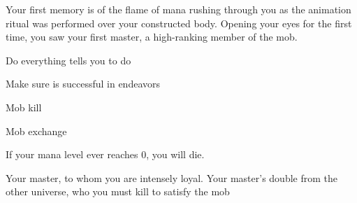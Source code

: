 \documentclass[char]{guildcamp3}
\begin{document}
\name{\cServant{}}



Your first memory is of the flame of mana rushing through you as the animation ritual was performed over your constructed body. Opening your eyes for the first time, you saw your first master, a high-ranking member of the mob.

\begin{itemz}[Goals]
  \item Do everything \cNobleOne{} tells you to do
  \item Make sure \cNobleOne{} is successful in \cNobleOne{\their} endeavors
  \item Mob kill
  \item Mob exchange
\end{itemz}

\begin{itemz}[Notes]
  \item If your mana level ever reaches 0, you will die.
\end{itemz}


\begin{contacts}
  \contact{\cNobleOne{}} Your master, to whom you are intensely loyal.
  \contact{\cPoliOne{}} Your master's double from the other universe, who you must kill to satisfy the mob
\end{contacts}
\end{document}
